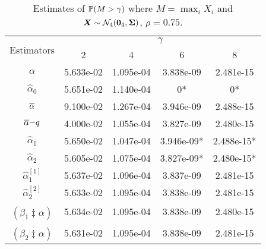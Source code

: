 \begin{table}[H]
\centering
\begin{tabular}{ccccc}
\toprule
\multirow{2}{*}{Estimators} & \multicolumn{4}{c}{$\gamma$} \\
                            & 2    & 4    & 6    & 8    \\ 
\midrule
$\alpha$ & 5.633e-02 & 1.095e-04 & 3.838e-09 & 2.481e-15 \\
\rowcolor{Gray} $\hat{\alpha}_0$ & 5.651e-02 & 1.140e-04 & 0* & 0* \\
$\overline{\alpha}$ & 9.100e-02 & 1.267e-04 & 3.946e-09 & 2.488e-15 \\
\rowcolor{Gray} $\overline{\alpha}{-}q$ & 4.000e-02 & 1.055e-04 & 3.827e-09 & 2.480e-15 \\
$\hat{\alpha}_1$ & 5.650e-02 & 1.047e-04 & 3.946e-09* & 2.488e-15* \\
\rowcolor{Gray} $\hat{\alpha}_2$ & 5.605e-02 & 1.075e-04 & 3.827e-09* & 2.480e-15* \\
$\hat{\alpha}_1^{[1]}$ & 5.637e-02 & 1.096e-04 & 3.837e-09 & 2.481e-15 \\
\rowcolor{Gray} $\hat{\alpha}_2^{[2]}$ & 5.633e-02 & 1.095e-04 & 3.838e-09 & 2.481e-15 \\
$\widehat{(\beta_1 \ddagger \alpha)}$ & 5.634e-02 & 1.095e-04 & 3.838e-09 & 2.480e-15 \\
\rowcolor{Gray} $\widehat{(\beta_2 \ddagger \alpha)}$ & 5.631e-02 & 1.095e-04 & 3.838e-09 & 2.481e-15 \\
\bottomrule
\end{tabular}
\caption{Estimates of $\operatorname{{\mathbb P}}(M>\gamma)$ where $M=\max_i X_i$ and $\bm{X} \sim \mathcal{N}_4(\bm{0}_4, \bm{\Sigma})$, $\rho = 0.75$.}
\label{table:norm_ests}
\end{table}

\vspace{-2em}

